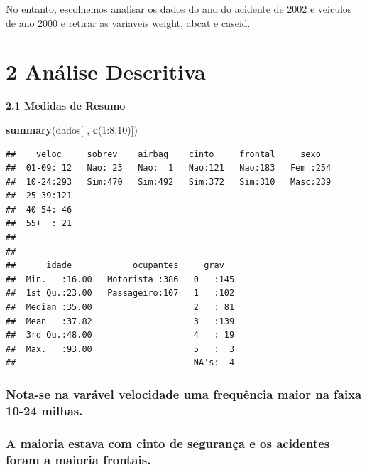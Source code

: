 \documentclass[]{article}
\newenvironment{Shaded}{\begin{snugshade}}{\end{snugshade}}
\newcommand{\KeywordTok}[1]{\textcolor[rgb]{0.13,0.29,0.53}{\textbf{{#1}}}}
\newcommand{\DecValTok}[1]{\textcolor[rgb]{0.00,0.00,0.81}{{#1}}}
\newcommand{\NormalTok}[1]{{#1}}
\begin{document}
No entanto, escolhemos analisar os dados do ano do acidente de 2002 e
veículos de ano 2000 e retirar as variaveis weight, abcat e caseid.

\section{2 Análise Descritiva}\label{analise-descritiva}

\textbf{2.1 Medidas de Resumo}

\begin{Shaded}
\begin{Highlighting}[]
\KeywordTok{summary}\NormalTok{(dados[ , }\KeywordTok{c}\NormalTok{(}\DecValTok{1}\NormalTok{:}\DecValTok{8}\NormalTok{,}\DecValTok{10}\NormalTok{)])}
\end{Highlighting}
\end{Shaded}

\begin{verbatim}
##    veloc     sobrev    airbag    cinto     frontal     sexo    
##  01-09: 12   Nao: 23   Nao:  1   Nao:121   Nao:183   Fem :254  
##  10-24:293   Sim:470   Sim:492   Sim:372   Sim:310   Masc:239  
##  25-39:121                                                     
##  40-54: 46                                                     
##  55+  : 21                                                     
##                                                                
##                                                                
##      idade            ocupantes     grav    
##  Min.   :16.00   Motorista :386   0   :145  
##  1st Qu.:23.00   Passageiro:107   1   :102  
##  Median :35.00                    2   : 81  
##  Mean   :37.82                    3   :139  
##  3rd Qu.:48.00                    4   : 19  
##  Max.   :93.00                    5   :  3  
##                                   NA's:  4
\end{verbatim}

\subsubsection{Nota-se na varável velocidade uma frequência maior na
faixa 10-24
milhas.}\label{nota-se-na-varavel-velocidade-uma-frequencia-maior-na-faixa-10-24-milhas.}

\subsubsection{A maioria estava com cinto de segurança e os acidentes
foram a maioria
frontais.}\label{a-maioria-estava-com-cinto-de-seguranca-e-os-acidentes-foram-a-maioria-frontais.}
\end{document}
